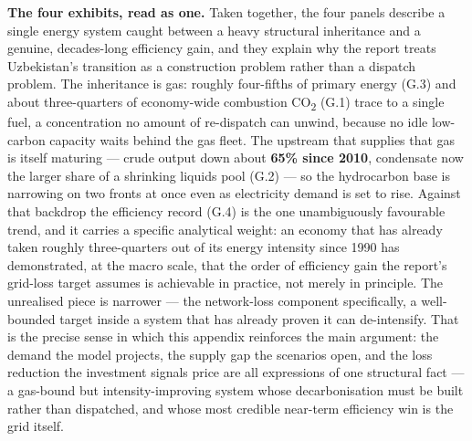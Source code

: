 \documentclass[10pt,twocolumn]{article}
\begin{document}
\textbf{The four exhibits, read as one.} Taken together, the four panels describe a single energy system caught between a heavy structural inheritance and a genuine, decades-long efficiency gain, and they explain why the report treats Uzbekistan's transition as a construction problem rather than a dispatch problem. The inheritance is gas: roughly four-fifths of primary energy (G.3) and about three-quarters of economy-wide combustion CO\textsubscript{2} (G.1) trace to a single fuel, a concentration no amount of re-dispatch can unwind, because no idle low-carbon capacity waits behind the gas fleet. The upstream that supplies that gas is itself maturing --- crude output down about \textbf{65\% since 2010}, condensate now the larger share of a shrinking liquids pool (G.2) --- so the hydrocarbon base is narrowing on two fronts at once even as electricity demand is set to rise. Against that backdrop the efficiency record (G.4) is the one unambiguously favourable trend, and it carries a specific analytical weight: an economy that has already taken roughly three-quarters out of its energy intensity since 1990 has demonstrated, at the macro scale, that the order of efficiency gain the report's grid-loss target assumes is achievable in practice, not merely in principle. The unrealised piece is narrower --- the network-loss component specifically, a well-bounded target inside a system that has already proven it can de-intensify. That is the precise sense in which this appendix reinforces the main argument: the demand the model projects, the supply gap the scenarios open, and the loss reduction the investment signals price are all expressions of one structural fact --- a gas-bound but intensity-improving system whose decarbonisation must be built rather than dispatched, and whose most credible near-term efficiency win is the grid itself.
\end{document}
